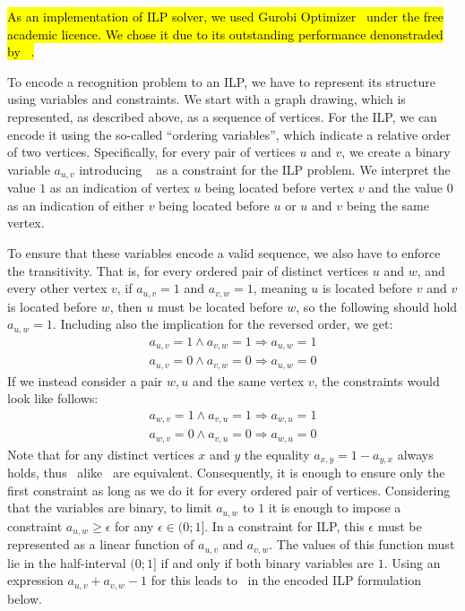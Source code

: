 \hl{As an implementation of ILP solver, we used Gurobi Optimizer~{\cite{gurobi}} under the free academic licence. We chose it due to its outstanding performance denonstraded by \mbox{\citeauthor{Gurobi-performance}}~{\cite{Gurobi-performance}}.}

To encode a recognition problem to an ILP, we have to represent its structure using variables and constraints. We start with a graph drawing, which is represented, as described above, as a sequence of vertices. For the ILP, we can encode it using the so-called ``ordering variables'', which indicate a relative order of two vertices. Specifically, for every pair of vertices \(u\) and \(v\), we create a binary variable \(a_{u, v}\) introducing ~ as a constraint for the ILP problem. We interpret the value \(1\) as an indication of vertex \(u\) being located before vertex \(v\) and the value \(0\) as an indication of either \(v\) being located before \(u\) or \(u\) and \(v\) being the same vertex.

To ensure that these variables encode a valid sequence, we also have to enforce the transitivity. That is, for every ordered pair of distinct vertices \(u\) and \(w\), and every other vertex \(v\), if \(a_{u, v} = 1\) and \(a_{v, w} = 1\), meaning \(u\) is located before \(v\) and \(v\) is located before \(w\), then \(u\) must be located before \(w\), so the following should hold \(a_{u, w} = 1\). Including also the implication for the reversed order, we get:
\begin{align}
    a_{u, v} = 1 \land a_{v, w} = 1 \Longrightarrow a_{u, w} = 1 \label{eq:ilp:transitivity:uv:1}\\
    a_{u, v} = 0 \land a_{v, w} = 0 \Longrightarrow a_{u, w} = 0 \label{eq:ilp:transitivity:uv:0}
\end{align}
If we instead consider a pair \(w, u\) and the same vertex \(v\),  the constraints would look like follows:
\begin{align}
    a_{w, v} = 1 \land a_{v, u} = 1 \Longrightarrow a_{w, u} = 1 \label{eq:ilp:transitivity:vu:1} \\
    a_{w, v} = 0 \land a_{v, u} = 0 \Longrightarrow a_{w, u} = 0 \label{eq:ilp:transitivity:vu:0}
\end{align}
Note that for any distinct vertices \(x\) and \(y\) the equality \(a_{x, y} = 1 - a_{y, x}\) always holds, thus~ alike~ are equivalent. Consequently, it is enough to ensure only the first constraint as long as we do it for every ordered pair of vertices. Considering that the variables are binary, to limit \(a_{u, w}\) to \(1\) it is enough to impose a constraint \(a_{u, w} \geqslant \epsilon\) for any \(\epsilon \in (0;1]\). In a constraint for ILP, this \(\epsilon\) must be represented as a linear function of \(a_{u, v}\) and \(a_{v, w}\). The values of this function must lie in the half-interval \((0;1]\) if and only if both binary variables are \(1\). Using an expression \(a_{u, v} + a_{v, w} - 1\) for this leads to~ in the encoded ILP formulation below.


